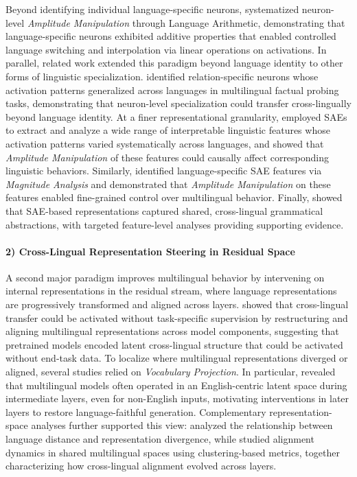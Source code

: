 \documentclass[11pt,letterpaper]{mystyle}
\begin{document}
  Beyond identifying individual language-specific neurons, \citet{gurgurov2025languagearithmeticssystematiclanguage} systematized neuron-level \textit{Amplitude Manipulation} through Language Arithmetic, demonstrating that language-specific neurons exhibited additive properties that enabled controlled language switching and interpolation via linear operations on activations.
  In parallel, related work extended this paradigm beyond language identity to other forms of linguistic specialization. \citet{liu-etal-2025-relation-specific} identified relation-specific neurons whose activation patterns generalized across languages in multilingual factual probing tasks, demonstrating that neuron-level specialization could transfer cross-lingually beyond language identity. 
  At a finer representational granularity, \citet{jing-etal-2025-lingualens} employed SAEs to extract and analyze a wide range of interpretable linguistic features whose activation patterns varied systematically across languages, and showed that \textit{Amplitude Manipulation} of these features could causally affect corresponding linguistic behaviors. 
  Similarly, \citet{andrylie2025sparseautoencoderscapturelanguagespecific} identified language-specific SAE features via \textit{Magnitude Analysis} and demonstrated that \textit{Amplitude Manipulation} on these features enabled fine-grained control over multilingual behavior. 
  Finally, \citet{brinkmann-etal-2025-large} showed that SAE-based representations captured shared, cross-lingual grammatical abstractions, with targeted feature-level analyses providing supporting evidence.
  
  \paragraph{2) Cross-Lingual Representation Steering in Residual Space}
  
  A second major paradigm improves multilingual behavior by intervening on internal representations in the residual stream, where language representations are progressively transformed and aligned across layers. \citet{chi-etal-2023-cross} showed that cross-lingual transfer could be activated without task-specific supervision by restructuring and aligning multilingual representations across model components, suggesting that pretrained models encoded latent cross-lingual structure that could be activated without end-task data. 
  To localize where multilingual representations diverged or aligned, several studies relied on \textit{Vocabulary Projection}. In particular, \citet{wendler2024llamas} revealed that multilingual models often operated in an English-centric latent space during intermediate layers, even for non-English inputs, motivating interventions in later layers to restore language-faithful generation.
  Complementary representation-space analyses further supported this view: \citet{philippy2023identifying} analyzed the relationship between language distance and representation divergence, while \citet{mousi2024exploring} studied alignment dynamics in shared multilingual spaces using clustering-based metrics, together characterizing how cross-lingual alignment evolved across layers.
  
\end{document}
